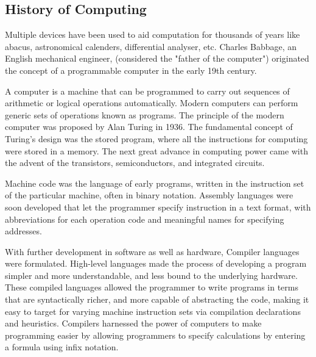 \subsection{History of Computing}
Multiple devices have been used to aid computation for thousands of years like \eg  abacus, astronomical calenders,  differential analyser, etc. Charles Babbage, an English mechanical engineer, (considered the "father of the computer") originated the concept of a programmable computer in the early 19th century.

\par A computer is a machine that can be programmed to carry out sequences of arithmetic or logical operations automatically. Modern computers can perform generic sets of operations known as programs. The principle of the modern computer was proposed by Alan Turing in 1936. The fundamental concept of Turing's design was the stored program, where all the instructions for computing were stored in a memory. The next great advance in computing power came with the advent of the transistors, semiconductors, and integrated circuits. 

\par Machine code was the language of early programs, written in the instruction set of the particular machine, often in binary notation. Assembly languages were soon developed that let the programmer specify instruction in a text format, with abbreviations for each operation code and meaningful names for specifying addresses. 

\par With further development in software as well as hardware, Compiler languages were formulated. High-level languages made the process of developing a program simpler and more understandable, and less bound to the underlying hardware. These compiled languages allowed the programmer to write programs in terms that are syntactically richer, and more capable of abstracting the code, making it easy to target for varying machine instruction sets via compilation declarations and heuristics. Compilers harnessed the power of computers to make programming easier  by allowing programmers to specify calculations by entering a formula using infix notation.

